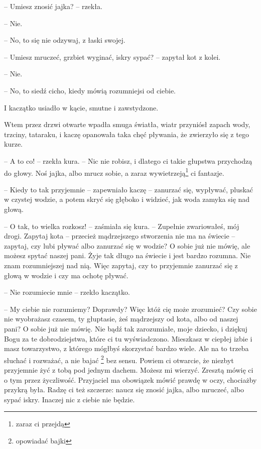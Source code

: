 \documentclass{book}
\begin{document}
-- Umiesz znosić jajka? -- rzekła.

-- Nie.

-- No, to się nie odzywaj, z łaski swojej.

-- Umiesz mruczeć, grzbiet wyginać, iskry sypać? -- zapytał kot z kolei.

-- Nie.

-- No, to siedź cicho, kiedy mówią rozumniejsi od ciebie.

I kaczątko usiadło w kącie, smutne i zawstydzone.

Wtem przez drzwi otwarte wpadła smuga światła, wiatr przyniósł zapach wody, trzciny, tataraku, i kaczę opanowała taka chęć pływania, że zwierzyło się z tego kurze.

-- A to co! -- rzekła kura. -- Nic nie robisz, i dlatego ci takie głupstwa przychodzą do głowy. Noś jajka, albo mrucz sobie, a zaraz  wywietrzeją\footnote{zaraz ci przejdą} ci fantazje.

-- Kiedy to tak przyjemnie -- zapewniało kaczę -- zanurzać się, wypływać, pluskać w czystej wodzie, a potem skryć się głęboko i widzieć, jak woda zamyka się nad głową.

-- O tak, to wielka rozkosz! -- zaśmiała się kura. -- Zupełnie zwariowałeś, mój drogi. Zapytaj kota -- przecież mądrzejszego stworzenia nie ma na świecie -- zapytaj, czy lubi pływać albo zanurzać się w wodzie? O sobie już nie mówię, ale możesz spytać naszej pani. Żyje tak długo na świecie i jest bardzo rozumna. Nie znam rozumniejszej nad nią. Więc zapytaj, czy to przyjemnie zanurzać się z głową w wodzie i czy ma ochotę pływać.

-- Nie rozumiecie mnie -- rzekło kaczątko.

-- My ciebie nie rozumiemy? Doprawdy? Więc któż cię może zrozumieć? Czy sobie nie wyobrażasz czasem, ty głuptasie, żeś mądrzejszy od kota, albo od naszej pani? O sobie już nie mówię. Nie bądź tak zarozumiałe, moje dziecko, i dziękuj Bogu za te dobrodziejstwa, które ci tu wyświadczono. Mieszkasz w ciepłej izbie i masz towarzystwo, z którego mógłbyś skorzystać bardzo wiele. Ale na to trzeba słuchać i rozważać, a nie  bajać \footnote{opowiadać bajki} bez sensu. Powiem ci otwarcie, że niezbyt przyjemnie żyć z tobą pod jednym dachem. Możesz mi wierzyć. Zresztą mówię ci o tym przez życzliwość. Przyjaciel ma obowiązek mówić prawdę w oczy, chociażby przykrą była. Radzę ci też szczerze: naucz się znosić jajka, albo mruczeć, albo sypać iskry. Inaczej nic z ciebie nie będzie.
\end{document}
